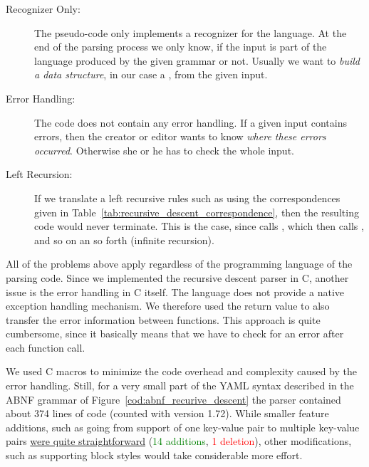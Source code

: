 \begin{description}
  \item [Recognizer Only:] The pseudo-code only implements a recognizer for the language. At the end of the parsing process we only know, if the input is part of the language produced by the given grammar or not. Usually we want to \emph{build a data structure}, in our case a , from the given input.

  \item [Error Handling:] The code does not contain any error handling. If a given input contains errors, then the creator or editor wants to know \emph{where these errors occurred}. Otherwise she or he has to check the whole input.

  \item [Left Recursion:] If we translate a left recursive rules such as  using the correspondences given in Table~\ref{tab:recursive_descent_correspondence}, then the resulting code would never terminate. This is the case, since  calls , which then calls , and so on an so forth (infinite recursion).
\end{description}

All of the problems above apply regardless of the programming language of the parsing code. Since we implemented the recursive descent parser in C, another issue is the error handling in C itself. The language does not provide a native exception handling mechanism. We therefore used the return value to also transfer the error information between functions. This approach is quite cumbersome, since it basically means that we have to check for an error after each function call.

We used C macros to minimize the code overhead and complexity caused by the error handling. Still, for a very small part of the YAML syntax described in the ABNF grammar of Figure~\ref{cod:abnf_recurive_descent} the parser contained about 374 lines of code (counted with  version 1.72). While smaller feature additions, such as going from support of one key-value pair to multiple key-value pairs \href{https://github.com/ElektraInitiative/libelektra/commit/17aa7a6ea5d9261287104213dcba67f4d0a0fcbc}{were quite straightforward} (\textcolor{Green}{14 additions}, \textcolor{Red}{1 deletion}), other modifications, such as supporting block styles would take considerable more effort.

